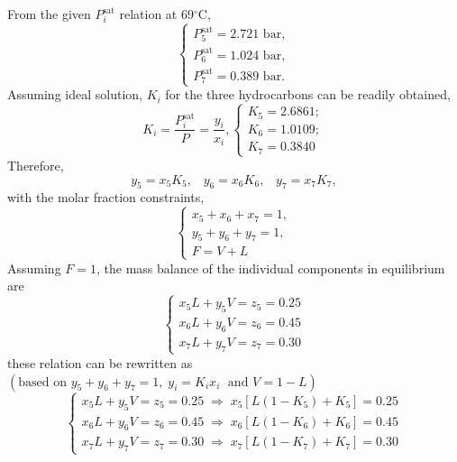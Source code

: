 \documentclass[12pts,a4paper,amsmath,amssymb,floatfix]{article}%
\newcommand{\frc}{\displaystyle\frac}
\begin{document}
\begin{enumerate}[1)]
From the given $P_{i}^{\text{sat}}$ relation at 69$^{\circ}$C,
   \begin{displaymath}
        \begin{cases}
            P_{5}^{\text{sat}} = 2.721 \text{ bar},\\ 
            P_{6}^{\text{sat}} = 1.024 \text{ bar},\\
            P_{7}^{\text{sat}} = 0.389 \text{ bar}.
        \end{cases}
   \end{displaymath}
Assuming ideal solution, $K_{i}$ for the three hydrocarbons can be readily obtained,
   \begin{displaymath}
        K_{i} = \frc{P_{i}^{\text{sat}}}{P} = \frc{y_{i}}{x_{i}},
          \begin{cases}
             K_{5} = 2.6861; \\
             K_{6} = 1.0109; \\
             K_{7} = 0.3840
          \end{cases}
   \end{displaymath}
   Therefore,
   \begin{displaymath}
       y_{5} = x_{5}K_{5},\;\;\;y_{6} = x_{6}K_{6},\;\;\;y_{7} = x_{7}K_{7},
   \end{displaymath}
    with the molar fraction constraints,
    \begin{displaymath}
        \begin{cases}
            x_{5}+x_{6}+x_{7} = 1,\\ 
            y_{5}+y_{6}+y_{7} = 1, \\
            F = V + L
        \end{cases}
   \end{displaymath}
   Assuming $F=1$, the mass balance of the individual components in equilibrium are
    \begin{displaymath}
        \begin{cases}
            x_{5}L + y_{5}V = z_{5} = 0.25 \\
            x_{6}L + y_{6}V = z_{6} = 0.45 \\
            x_{7}L + y_{7}V = z_{7} = 0.30            
        \end{cases}
   \end{displaymath}
   these relation can be rewritten as $\left(\text{based on }y_{5}+y_{6}+y_{7} = 1,\; y_{i}=K_{i}x_{i} \;\text{ and } V= 1-L\right)$
    \begin{displaymath}
        \begin{cases}
            x_{5}L + y_{5}V = z_{5} = 0.25 \;\Longrightarrow\; x_{5}\left[L\left(1-K_{5}\right)+K_{5}\right] = 0.25 \\
            x_{6}L + y_{6}V = z_{6} = 0.45 \;\Longrightarrow\; x_{6}\left[L\left(1-K_{6}\right)+K_{6}\right] = 0.45 \\
            x_{7}L + y_{7}V = z_{7} = 0.30 \;\Longrightarrow\; x_{7}\left[L\left(1-K_{7}\right)+K_{7}\right] = 0.30
        \end{cases}
   \end{displaymath}



\end{enumerate}
\end{document}

